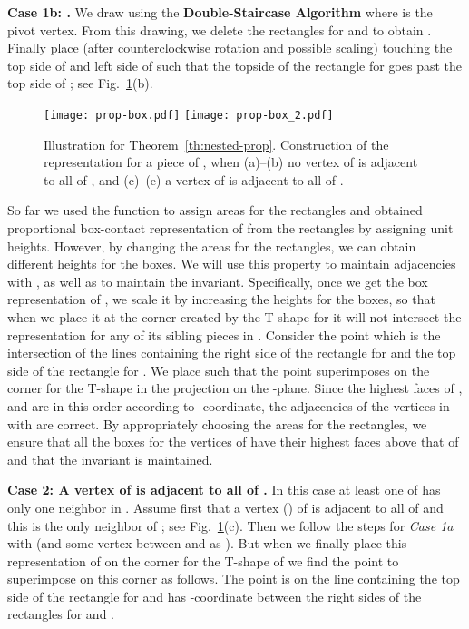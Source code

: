 \documentclass{llncs}
\begin{document}
	
	\textbf{Case 1b: .} We draw  using the \textbf{Double-Staircase Algorithm}
	where  is the pivot vertex. From this drawing, we delete the rectangles for 
and  to obtain . Finally place  (after  counterclockwise
	rotation and possible scaling) touching the top side of  and left side of  such
	that the topside of the rectangle for  goes past the top side of ; see Fig.~\ref{fig:prop}(b).
	

\begin{figure}[htbp]
\vspace{-1cm}
	\centering
	\texttt{[image: prop-box.pdf]}
	\texttt{[image: prop-box\_2.pdf]}
	\caption{Illustration for Theorem~\ref{th:nested-prop}.
	Construction of the representation for a piece  of ,
when (a)--(b) no vertex of  is adjacent to all of , and
	(c)--(e) a vertex of  is adjacent to all of .}
\label{fig:prop}
\end{figure}



	
So far we used the function  to assign areas for the rectangles and obtained proportional box-contact representation of  from the rectangles by assigning unit heights. However, by changing the areas for the
	rectangles, we can obtain different heights for the boxes. We will use this property to maintain adjacencies with , as well as to maintain the invariant. Specifically, once we get the box
	representation of , we scale it 
by increasing the heights for the boxes, so that when we place it at the corner created by
	the T-shape for  it will not intersect the representation for
	any of its sibling pieces in . Consider the point  which is the intersection
	of the lines containing the right side of the rectangle for  and the top side of the
	rectangle for . We place  such that the point  superimposes
	on the corner for the T-shape in the projection on the -plane. Since the highest faces
	of ,  and  are in this order according to -coordinate,
	the adjacencies of the vertices in  with  are correct. By appropriately choosing the areas
	for the rectangles, we ensure that all the boxes for the vertices of 
	have their highest faces above that of  and that the invariant is maintained.
	






	


	\noindent
	\textbf{Case 2: A vertex of  is adjacent to all of .} In this case at
	least one of  has only one neighbor in . Assume first that a vertex 
	() of  is adjacent to all of  and this is the only neighbor of ;
	see Fig.~\ref{fig:prop}(c).
 Then we follow the steps for \textit{Case 1a}
	with  (and some vertex between  and  as ). But when we finally
	place this representation of  on the corner for the T-shape of  we find
	the point  to superimpose on this corner as follows. The point  is on the line
	containing the top side of the rectangle for  and has -coordinate between the
	right sides of the rectangles for  and .
\end{document}
